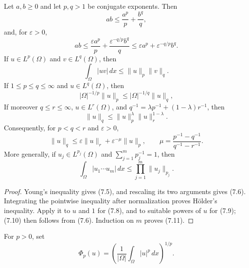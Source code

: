 \begin{proposition}
\label{gt:prop-sobolev-lp-inequalities}
Let $a,b\geq0$ and let $p,q>1$ be conjugate exponents. Then
\begin{equation}
\tag{7.5}
ab\leq \frac{a^p}{p}+\frac{b^q}{q},
\end{equation}
and, for $\varepsilon>0$,
\begin{equation}
\tag{7.6}
ab\leq \frac{\varepsilon a^p}{p}
+\frac{\varepsilon^{-q/p}b^q}{q}
\leq \varepsilon a^p+\varepsilon^{-q/p}b^q.
\end{equation}
If $u\in L^p(\Omega)$ and $v\in L^q(\Omega)$, then
\begin{equation}
\tag{7.7}
\int_\Omega |uv|\,dx\leq \|u\|_p\|v\|_q.
\end{equation}
If $1\leq p\leq q\leq\infty$ and $u\in L^q(\Omega)$, then
\begin{equation}
\tag{7.8}
|\Omega|^{-1/p}\|u\|_p
\leq |\Omega|^{-1/q}\|u\|_q,
\end{equation}
If moreover $q\leq r\leq\infty$, $u\in L^r(\Omega)$, and
$q^{-1}=\lambda p^{-1}+(1-\lambda)r^{-1}$, then
\begin{equation}
\tag{7.9}
\|u\|_q\leq \|u\|_p^\lambda\|u\|_r^{1-\lambda}.
\end{equation}
Consequently, for $p<q<r$ and $\varepsilon>0$,
\begin{equation}
\tag{7.10}
\|u\|_q\leq \varepsilon\|u\|_r
+\varepsilon^{-\mu}\|u\|_p,
\qquad
\mu=\frac{p^{-1}-q^{-1}}{q^{-1}-r^{-1}}.
\end{equation}
More generally, if $u_j\in L^{p_j}(\Omega)$ and
$\sum_{j=1}^m p_j^{-1}=1$, then
\begin{equation}
\tag{7.11}
\int_\Omega |u_1\cdots u_m|\,dx
\leq \prod_{j=1}^m\|u_j\|_{p_j}.
\end{equation}
\end{proposition}
\begin{proof}
\sketch Young's inequality gives (7.5), and rescaling its two arguments gives
(7.6). Integrating the pointwise inequality after normalization proves
H\"older's inequality. Apply it to $u$ and $1$ for (7.8), and to suitable
powers of $u$ for (7.9); (7.10) then follows from (7.6). Induction on $m$
proves (7.11).
\end{proof}

\begin{definition}
\label{gt:def-sobolev-normalized-lp-functional}
For $p>0$, set
\begin{equation}
\tag{7.12}
\Phi_p(u)=\left(\frac1{|\Omega|}\int_\Omega |u|^p\,dx\right)^{1/p}.
\end{equation}
\end{definition}

